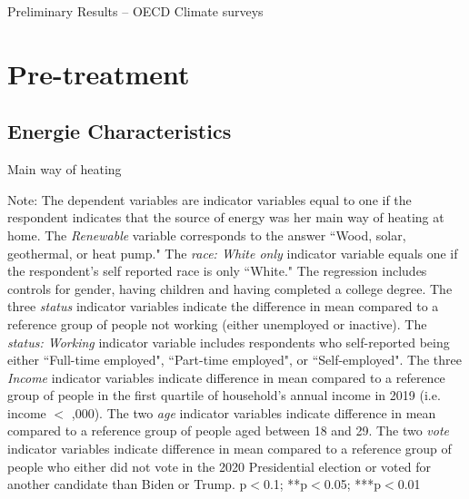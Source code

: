 \documentclass{article}
\begin{document}
\begin{LARGE}
	\begin{center}
		Preliminary Results – OECD Climate surveys	
	\end{center}
	
\end{LARGE}
	\tableofcontents
	\listoftables

\clearpage

\section{Pre-treatment}

\subsection{Energie Characteristics}

\begin{table}[h!]
	\caption{Main way of heating} \label{table heating}
	\begin{center}
		\scalebox{0.7}{}
	\end{center}
	{\footnotesize Note: The dependent variables are indicator variables equal to one if the respondent indicates that the source of energy was her main way of heating at home. The \textit{Renewable} variable corresponds to the answer ``Wood, solar, geothermal, or heat pump."
	The \textit{race: White only} indicator variable equals one if the respondent's self reported race is only ``White." The regression includes controls for gender, having children and having completed a college degree. The three \textit{status} indicator variables indicate the difference in mean compared to a reference group of people not working (either unemployed or inactive). The \textit{status: Working} indicator variable includes respondents who self-reported being either ``Full-time employed", ``Part-time employed", or ``Self-employed". The three \textit{Income} indicator variables indicate difference in mean compared to a reference group of people in the first quartile of household's annual income in 2019 (i.e. income $<$ ,000). The two \textit{age} indicator variables indicate difference in mean compared to a reference group of people aged between 18 and 29. The two \textit{vote} indicator variables indicate difference in mean compared to a reference group of people who either did not vote in the 2020 Presidential election or voted for another candidate than Biden or Trump.
	\newline  *p$<$0.1; **p$<$0.05; ***p$<$0.01}
\end{table}	
\end{document}

